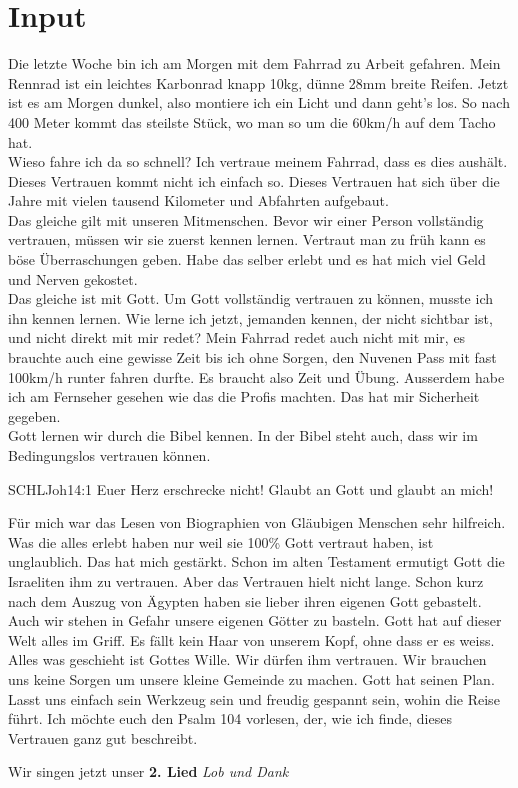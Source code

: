 \documentclass{../inc/mybib}
\begin{document}
\section{ Input }
\begin{spacing}{1.5}
Die letzte Woche bin ich am Morgen mit dem Fahrrad zu Arbeit gefahren. Mein Rennrad ist ein leichtes Karbonrad knapp 10kg, dünne 28mm breite Reifen. Jetzt ist es am Morgen dunkel, also montiere ich ein Licht und dann geht's los. So nach 400 Meter kommt das steilste Stück, wo man so um die 60km/h auf dem Tacho hat. \\
Wieso fahre ich da so schnell? Ich vertraue meinem Fahrrad, dass es dies aushält. Dieses Vertrauen kommt nicht ich einfach so. Dieses Vertrauen hat sich über die Jahre mit vielen tausend Kilometer und Abfahrten aufgebaut. \\
Das gleiche gilt mit unseren Mitmenschen. Bevor wir einer Person vollständig vertrauen, müssen wir sie zuerst kennen lernen. Vertraut man zu früh kann es böse Überraschungen geben. Habe das selber erlebt und es hat mich viel Geld und Nerven gekostet.  \\
Das gleiche ist mit Gott. Um Gott vollständig vertrauen zu können, musste ich ihn kennen lernen. Wie lerne ich jetzt, jemanden kennen, der nicht sichtbar ist, und nicht direkt mit mir redet? Mein Fahrrad redet auch nicht mit mir, es brauchte auch eine gewisse Zeit bis ich ohne Sorgen, den Nuvenen Pass mit fast 100km/h runter fahren durfte. Es braucht also Zeit und Übung. Ausserdem habe ich am Fernseher gesehen wie das die Profis machten. Das hat mir Sicherheit gegeben. \\
Gott lernen wir durch die Bibel kennen. In der Bibel steht auch, dass wir im Bedingungslos vertrauen können.
\begin{bibelbox}{SCHL}{Joh}{14:1}
Euer Herz erschrecke nicht! Glaubt an Gott und glaubt an mich!
\end{bibelbox}
Für mich war das Lesen von Biographien von Gläubigen Menschen sehr hilfreich. Was die alles erlebt haben nur weil sie 100\% Gott vertraut haben, ist unglaublich. Das hat mich gestärkt.
Schon im alten Testament ermutigt Gott die Israeliten ihm zu vertrauen. Aber das Vertrauen hielt nicht lange. Schon kurz nach dem Auszug von Ägypten haben sie lieber ihren eigenen Gott gebastelt. \\
Auch wir stehen in Gefahr unsere eigenen Götter zu basteln. Gott hat auf dieser Welt alles im Griff. Es fällt kein Haar von unserem Kopf, ohne dass er es weiss. Alles was geschieht ist Gottes Wille. Wir dürfen ihm vertrauen. Wir brauchen uns keine Sorgen um unsere kleine Gemeinde zu machen. Gott hat seinen Plan. Lasst uns einfach sein Werkzeug sein und freudig gespannt sein, wohin die Reise führt.
Ich möchte euch den Psalm 104 vorlesen, der, wie ich finde, dieses Vertrauen ganz gut beschreibt.

\end{spacing}
Wir singen jetzt unser \textbf{2. Lied} \textit{Lob und Dank}
\end{document}

